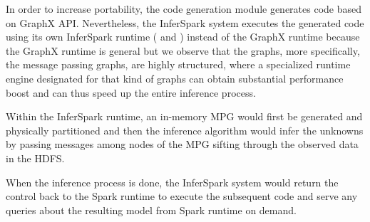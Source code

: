 In order to increase portability,
the code generation module generates code based on GraphX API.
Nevertheless,
the InferSpark system executes the generated code
using its own InferSpark runtime
( and )
instead of the GraphX runtime
because the GraphX runtime is general
but we observe that the graphs, more specifically, the message passing graphs,
are highly structured, where a specialized runtime engine designated for that kind of graphs can obtain substantial performance boost
and can thus speed up the entire inference process.

Within the InferSpark runtime,
an in-memory MPG would first be generated
and physically partitioned
and then the inference algorithm
would   infer the unknowns
 by
passing messages among nodes of the MPG
sifting through the observed data in the HDFS.


When the inference process is done, the InferSpark system
would 
return the control back to the Spark runtime  to execute the subsequent code
and serve any queries about the resulting model from Spark runtime on demand.











